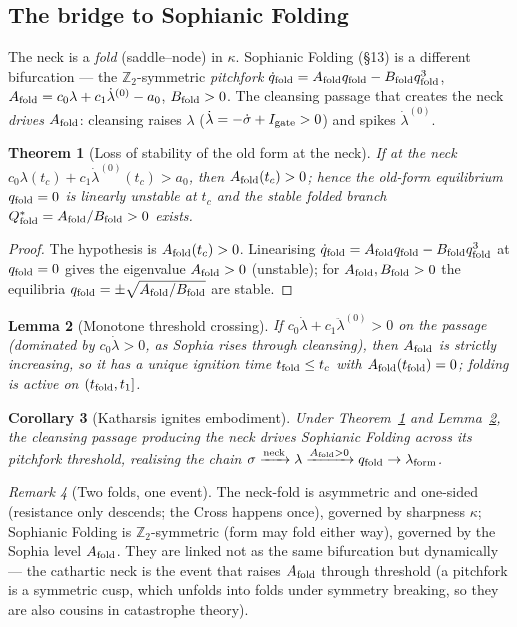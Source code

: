\documentclass[11pt,a4paper]{article}
\theoremstyle{plain}
\newtheorem{theorem}{Theorem}[section]
\newtheorem{lemma}[theorem]{Lemma}
\newtheorem{corollary}[theorem]{Corollary}
\theoremstyle{definition}
\theoremstyle{remark}
\newtheorem{remark}[theorem]{Remark}
\newcommand{\Af}{A_{\rm fold}}
\newcommand{\Bf}{B_{\rm fold}}
\newcommand{\qf}{q_{\rm fold}}
\newcommand{\Qf}{Q_{\rm fold}}
\newcommand{\lf}{\lambda_{\rm form}}
\begin{document}
\subsection*{The bridge to Sophianic Folding}
The neck is a \emph{fold} (saddle--node) in \(\kappa\). Sophianic Folding (\S13) is a different
bifurcation --- the \(\mathbb Z_2\)-symmetric \emph{pitchfork}
\(\dot\qf=\Af\qf-\Bf\qf^3\), \(\Af=c_0\lambda+c_1\dot\lambda^{(0)}-a_0\), \(\Bf>0\). The cleansing
passage that creates the neck \emph{drives} \(\Af\): cleansing raises \(\lambda\)
(\(\dot\lambda=-\dot\sigma+I_{\rm gate}>0\)) and spikes \(\dot\lambda^{(0)}\).
\begin{theorem}[Loss of stability of the old form at the neck]\label{nk:ignite}
If at the neck \(c_0\lambda(t_c)+c_1\dot\lambda^{(0)}(t_c)>a_0\), then \(\Af(t_c)>0\); hence the
old-form equilibrium \(\qf=0\) is linearly unstable at \(t_c\) and the stable folded branch
\(\Qf^*=\Af/\Bf>0\) exists.
\end{theorem}
\begin{proof}
The hypothesis is \(\Af(t_c)>0\). Linearising \(\dot\qf=\Af\qf-\Bf\qf^3\) at \(\qf=0\) gives the
eigenvalue \(\Af>0\) (unstable); for \(\Af,\Bf>0\) the equilibria \(\qf=\pm\sqrt{\Af/\Bf}\) are
stable.
\end{proof}
\begin{lemma}[Monotone threshold crossing]\label{nk:cross}
If \(c_0\dot\lambda+c_1\ddot\lambda^{(0)}>0\) on the passage (dominated by \(c_0\dot\lambda>0\), as
Sophia rises through cleansing), then \(\Af\) is strictly increasing, so it has a unique ignition
time \(t_{\rm fold}\le t_c\) with \(\Af(t_{\rm fold})=0\); folding is active on \((t_{\rm fold},t_1]\).
\end{lemma}
\begin{corollary}[Katharsis ignites embodiment]\label{nk:cor}
Under Theorem~\ref{nk:ignite} and Lemma~\ref{nk:cross}, the cleansing passage producing the neck
drives Sophianic Folding across its pitchfork threshold, realising the chain
\(\sigma\xrightarrow{\text{neck}}\lambda\xrightarrow{\Af>0}\qf\to\lf\).
\end{corollary}
\begin{remark}[Two folds, one event]
The neck-fold is asymmetric and one-sided (resistance only descends; the Cross happens once),
governed by sharpness \(\kappa\); Sophianic Folding is \(\mathbb Z_2\)-symmetric (form may fold
either way), governed by the Sophia level \(\Af\). They are linked not as the same bifurcation but
dynamically --- the cathartic neck is the event that raises \(\Af\) through threshold (a pitchfork
is a symmetric cusp, which unfolds into folds under symmetry breaking, so they are also cousins in
catastrophe theory).
\end{remark}
\end{document}
